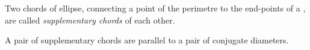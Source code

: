 \documentclass[12pt]{article}
\theoremstyle{definition}
\begin{document}
Two chords of ellipse, connecting a point of the perimetre to the end-points of a , are called {\em supplementary chords} of each other.

A pair of supplementary chords are parallel to a pair of conjugate diameters.
\end{document}

